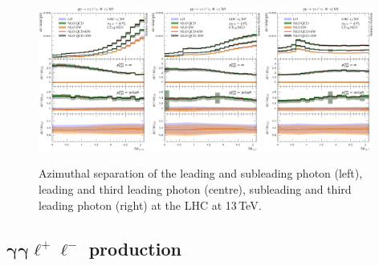 \begin{figure}[t!]
  \centering
  \includegraphics[width=0.32\textwidth]{figs_aaw/dphi_y1_y2}
  \includegraphics[width=0.32\textwidth]{figs_aaw/dphi_y1_l1}
  \includegraphics[width=0.32\textwidth]{figs_aaw/dphi_y2_l1}
  \caption{
    Azimuthal separation of the leading and subleading photon (left),
    leading and third leading photon (centre), subleading and third leading 
    photon (right) at the LHC at 13\,TeV.\\
    \label{fig:aaw:dphi}
  }
\end{figure}


\subsection[\texorpdfstring{$\gamma\gamma\ell^+\ell^-$}{aall} production]
           {$\boldsymbol{\gamma\gamma\ell^+\ell^-}$ production}
\label{sec:results:aaz}


